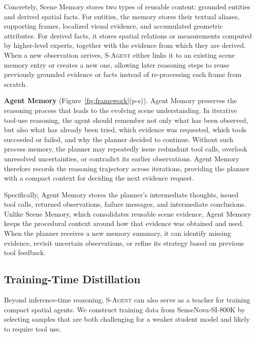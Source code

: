 Concretely, Scene Memory stores two types of reusable content: grounded entities and derived spatial facts.
For entities, the memory stores their textual aliases, supporting frames, localized visual evidence, and accumulated geometric attributes. 
For derived facts, it stores spatial relations or measurements computed by higher-level experts, together with the evidence from which they are derived.
% 
When a new observation arrives, \textsc{S-Agent} either links it to an existing scene memory entry or creates a new one, allowing later reasoning steps to reuse previously grounded evidence or facts instead of re-processing each frame from scratch.


\textbf{Agent Memory} (Figure~\ref{fig:framework}(p-s)).
Agent Memory preserves the reasoning process that leads to the evolving scene understanding. 
In iterative tool-use reasoning, the agent should remember not only what has been observed, but also what has already been tried, which evidence was requested, which tools succeeded or failed, and why the planner decided to continue.
% 
Without such process memory, the planner may repeatedly issue redundant tool calls, overlook unresolved uncertainties, or contradict its earlier observations.
% 
Agent Memory therefore records the reasoning trajectory across iterations, providing the planner with a compact context for deciding the next evidence request.

Specifically, Agent Memory stores the planner's intermediate thoughts, issued tool calls, returned observations, failure messages, and intermediate conclusions.
% 
Unlike Scene Memory, which consolidates reusable scene evidence, Agent Memory keeps the procedural context around how that evidence was obtained and used. 
% 
When the planner receives a new memory summary, it can identify missing evidence, revisit uncertain observations, or refine its strategy based on previous tool feedback.


\subsection{Training-Time Distillation}
\label{sec:method:training}
Beyond inference-time reasoning, \textsc{S-Agent} can also serve as a teacher for training compact spatial agents. 
We construct training data from SenseNova-SI-800K \citep{sensenova_si} by selecting samples that are both challenging for a weaker student model and likely to require tool use. 

